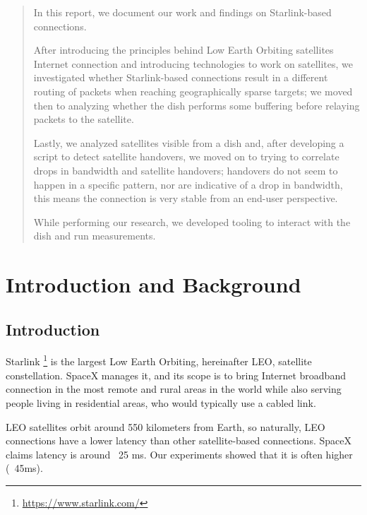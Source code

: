 \documentclass[IN,11pt,twoside,openright,idp,english]{tumthesis}
\author{Roberto Castellotti}
\date{September 15, 2016}
\begin{document}
\maketitle
\cleardoublepage

\begin{abstract} 
In this report, we document our work and findings on Starlink-based connections. 

After introducing the principles behind Low Earth Orbiting satellites Internet connection and introducing technologies to work on satellites, we investigated whether Starlink-based connections result in a different routing of packets when reaching geographically sparse targets; we moved then to analyzing whether the dish performs some buffering before relaying packets to the satellite.

Lastly, we analyzed satellites visible from a dish and, after developing a script to detect satellite handovers, we moved on to trying to correlate drops in bandwidth and satellite handovers; handovers do not seem to happen in a specific pattern, nor are indicative of a drop in bandwidth, this means the connection is very stable from an end-user perspective.

While performing our research, we developed tooling to interact with the dish and run measurements.
\end{abstract}

\tableofcontents
\listoffigures
\listoftables
\startcontent
\chapter{Introduction and Background}

\section{Introduction}

Starlink \footnote{\url{https://www.starlink.com/}} is the largest Low Earth Orbiting, hereinafter LEO, satellite constellation. SpaceX manages it, and its scope is to bring Internet broadband connection in the most remote and rural areas in the world while also serving people living in residential areas, who would typically use a cabled link.

LEO satellites orbit around 550 kilometers from Earth, so naturally, LEO connections have a lower latency than other satellite-based connections. SpaceX claims latency is around ~25 ms. Our experiments showed that it is often higher (~45ms). 
\end{document}
